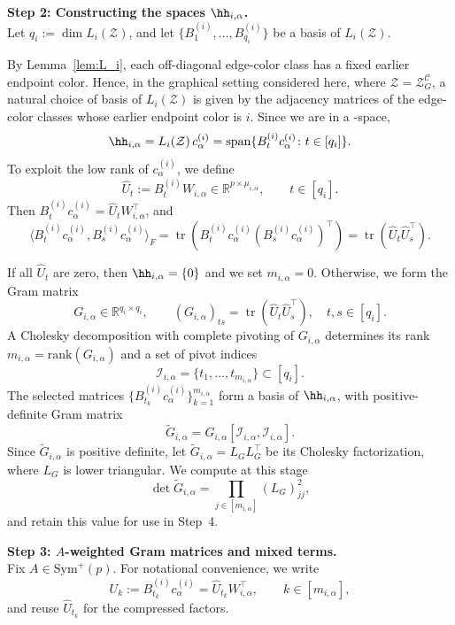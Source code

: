 \documentclass[12pt]{amsart}
\theoremstyle{plain}
\theoremstyle{definition}
\theoremstyle{remark}
\newcommand{\R}{\mathbb{R}}
\newcommand{\1}{\mathbf{1}}
\newcommand{\tr}{\operatorname{tr}}
\begin{document}
\noindent\textbf{Step 2: Constructing the spaces $\hh_{i,\alpha}$.}\\
Let $q_i:=\dim L_i(\mathcal Z)$, and let
$\{B_1^{(i)},\dots,B_{q_i}^{(i)}\}$ be a basis of
$L_i(\mathcal Z)$.
\par\noindent
By Lemma~\ref{lem:L_i}, each off-diagonal edge-color class has a fixed
earlier endpoint color. Hence, in the graphical setting considered
here, where $\mathcal{Z}=\mathcal{Z}_G^{\mathcal{C}}$, a natural choice of
basis of $L_i(\mathcal{Z})$ is given by the adjacency matrices of the
edge-color classes whose earlier endpoint color is $i$.
Since we are in a \cBC-space, 
\[
  \hh_{i,\alpha} = L_i(\mathcal{Z})\,c_\alpha^{(i)}
  = \mathrm{span}\{B_t^{(i)} c_\alpha^{(i)} \colon t\in[q_i]\}.
\]
To exploit the low rank of $c_\alpha^{(i)}$, we define
\[
  \widehat U_t := B_t^{(i)} W_{i,\alpha}\in\R^{p\times \mu_{i,\alpha}},
  \qquad t\in[q_i].
\]
Then $B_t^{(i)}c_\alpha^{(i)} = \widehat U_t W_{i,\alpha}^\top$, and
\[
  \langle B_t^{(i)}c_\alpha^{(i)}, B_s^{(i)}c_\alpha^{(i)}\rangle_F
  = \tr( B_t^{(i)}c_{\alpha}^{(i)}(B_s^{(i)}c_{\alpha}^{(i)})^\top)
  = \tr(\widehat U_t \widehat U_s^\top).
\]

If all $\widehat U_t$ are zero, then $\hh_{i,\alpha} = \{0\}$ and
we set $m_{i,\alpha}=0$.
Otherwise, we form the Gram matrix
\[
  G_{i,\alpha}\in\R^{q_i\times q_i},\qquad
  (G_{i,\alpha})_{ts}
  = \tr(\widehat U_t \widehat U_s^\top),\quad t,s\in[q_i].
\]
A Cholesky decomposition with complete pivoting of $G_{i,\alpha}$
determines its rank
$m_{i,\alpha}=\mathrm{rank}(G_{i,\alpha})$
and a set of pivot indices
\[
  \mathcal I_{i,\alpha}
  =\{t_1,\ldots,t_{m_{i,\alpha}}\}\subset[q_i].
\]
The selected matrices
$\{B_{t_k}^{(i)}c_\alpha^{(i)}\}_{k=1}^{m_{i,\alpha}}$
form a basis of $\hh_{i,\alpha}$, with positive-definite Gram matrix
\[
  \widetilde G_{i,\alpha}
  =G_{i,\alpha}[\mathcal I_{i,\alpha},\mathcal I_{i,\alpha}].
\]
Since $\widetilde G_{i,\alpha}$ is positive definite, let
$\widetilde G_{i,\alpha}=L_G L_G^\top$ be its Cholesky factorization,
where $L_G$ is lower triangular. We compute at this stage
\[
  \det\widetilde G_{i,\alpha}
  = \prod_{j\in[m_{i,\alpha}]}(L_G)_{jj}^2,
\]
and retain this value for use in Step~4.


\noindent\textbf{Step 3: $A$-weighted Gram matrices and mixed terms.}\\
Fix $A\in\mathrm{Sym}^+(p)$.
For notational convenience, we write
\[
  U_k := B_{t_k}^{(i)} c_\alpha^{(i)}
       = \widehat U_{t_k} W_{i,\alpha}^\top,
  \qquad k\in[m_{i,\alpha}],
\]
and reuse $\widehat U_{t_k}$ for the compressed factors.
\end{document}
